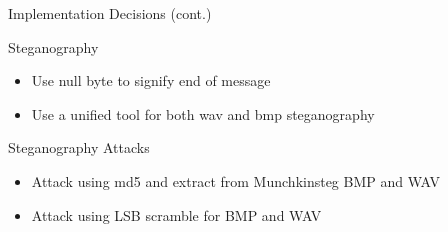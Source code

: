 \documentclass[presentation]{beamer}
\begin{document}
\begin{frame}[label=sec-2-3]{Implementation Decisions (cont.)}
\begin{block}{Steganography}
\begin{itemize}
\item Use null byte to signify end of message
\item Use a unified tool for both wav and bmp steganography
\end{itemize}
\end{block}
\begin{block}{Steganography Attacks}
\begin{itemize}
\item Attack using md5 and extract from Munchkinsteg BMP and WAV
\item Attack using LSB scramble for BMP and WAV
\end{itemize}
\end{block}
\end{frame}
\end{document}
